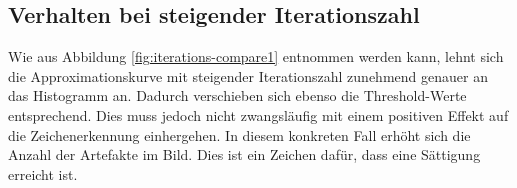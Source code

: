 		\subsection{Verhalten bei steigender Iterationszahl}
		\label{sub:behav-rising-it}
			Wie aus Abbildung \ref{fig:iterations-compare1} entnommen werden kann, lehnt sich die Approximationskurve mit steigender Iterationszahl zunehmend genauer an das Histogramm an. Dadurch verschieben sich ebenso die Threshold-Werte entsprechend. Dies muss jedoch nicht zwangsläufig mit einem positiven Effekt auf die Zeichenerkennung einhergehen. In diesem konkreten Fall erhöht sich die Anzahl der Artefakte im Bild. Dies ist ein Zeichen dafür, dass eine Sättigung erreicht ist.
			\begin{figure}[H]
				\centering
				
				

\end{figure}
